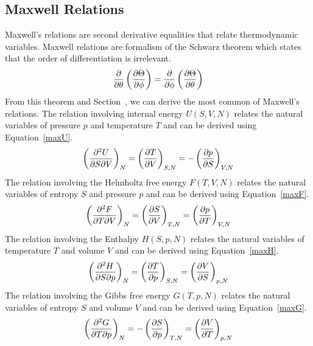 \subsection{Maxwell Relations}\label{maxwell}
Maxwell's relations are second derivative equalities that relate thermodynamic variables. Maxwell relations are formalism of the Schwarz theorem which states that the order of differentiation is irrelevant.
\begin{align}
    \pdv{}{\theta}\left(\pdv{\Theta}{\phi}\right)=\pdv{}{\phi}\left(\pdv{\Theta}{\theta}\right)
\end{align}
From this theorem and Section~, we can derive the most common of Maxwell's relations. The relation involving internal energy $U\left(S,V,N\right)$ relates the natural variables of pressure $p$ and temperature $T$ and can be derived using Equation~\ref{maxU}.
\begin{align}
    \left( {\pdv{U}{S}{V}} \right )_{N} = \left( \pdv{T}{V}\right )_{S,N} = - \left( \pdv{p}{S}\right )_{V,N}
\end{align}
The relation involving the Helmholtz free energy $F\left(T,V,N\right)$ relates the natural variables of entropy $S$ and pressure $p$ and can be derived using Equation~\ref{maxF}.
\begin{align}
    \left( {\pdv{F}{T}{V}} \right )_{N} = \left( \pdv{S}{V}\right )_{T,N} = \left( \pdv{p}{T}\right )_{V,N}
\end{align}
The relation involving the Enthalpy $H\left(S,p,N\right)$ relates the natural variables of temperature $T$ and volume $V$ and can be derived using Equation~\ref{maxH}.
\begin{align}
    \left( {\pdv{H}{S}{p}} \right )_{N} = \left( \pdv{T}{p}\right )_{S,N} =  \left( \pdv{V}{S}\right )_{p,N}
\end{align}
The relation involving the Gibbs free energy $G\left(T,p,N\right)$ relates the natural variables of entropy $S$ and volume $V$ and can be derived using Equation~\ref{maxG}.
\begin{align}
    \left( {\pdv{G}{T}{p}} \right )_{N} = -\left( \pdv{S}{p}\right )_{T,N} = \left( \pdv{V}{T}\right )_{p,N}
\end{align}

